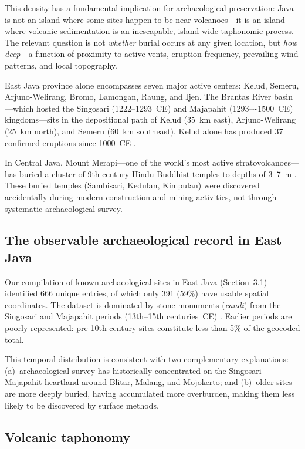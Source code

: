 \documentclass[12pt,a4paper]{article}
\begin{document}
This density has a fundamental implication for archaeological preservation: Java is not an island where some sites happen to be near volcanoes---it is an island where volcanic sedimentation is an inescapable, island-wide taphonomic process. The relevant question is not \textit{whether} burial occurs at any given location, but \textit{how deep}---a function of proximity to active vents, eruption frequency, prevailing wind patterns, and local topography.

East Java province alone encompasses seven major active centers: Kelud, Semeru, Arjuno-Welirang, Bromo, Lamongan, Raung, and Ijen. The Brantas River basin---which hosted the Singosari (1222--1293~CE) and Majapahit (1293--\textasciitilde1500~CE) kingdoms---sits in the depositional path of Kelud (35~km east), Arjuno-Welirang (25~km north), and Semeru (60~km southeast). Kelud alone has produced 37 confirmed eruptions since 1000~CE \citep{gvp2024,maeno2019}.

In Central Java, Mount Merapi---one of the world's most active stratovolcanoes---has buried a cluster of 9th-century Hindu-Buddhist temples to depths of 3--7~m \citep{lavigne2000,thouret2000}. These buried temples (Sambisari, Kedulan, Kimpulan) were discovered accidentally during modern construction and mining activities, not through systematic archaeological survey.

\subsection{The observable archaeological record in East Java}

Our compilation of known archaeological sites in East Java (Section~3.1) identified 666 unique entries, of which only 391 (59\%) have usable spatial coordinates. The dataset is dominated by stone monuments (\textit{candi}) from the Singosari and Majapahit periods (13th--15th centuries~CE) \citep{kinney2003}. Earlier periods are poorly represented: pre-10th century sites constitute less than 5\% of the geocoded total.

This temporal distribution is consistent with two complementary explanations: (a)~archaeological survey has historically concentrated on the Singosari-Majapahit heartland around Blitar, Malang, and Mojokerto; and (b)~older sites are more deeply buried, having accumulated more overburden, making them less likely to be discovered by surface methods.

\subsection{Volcanic taphonomy}
\end{document}
